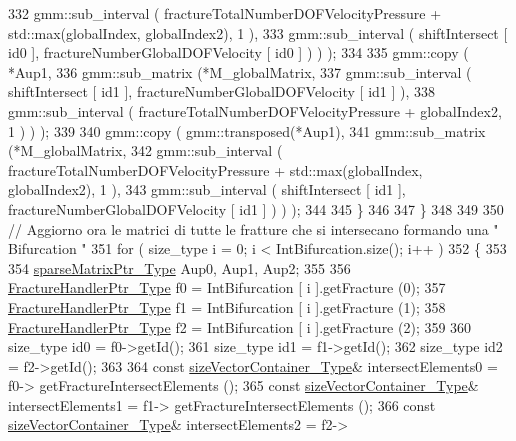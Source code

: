 \begin{DoxyCode}
332                                         gmm::sub\_interval (  fractureTotalNumberDOFVelocityPressure + 
      std::max(globalIndex, globalIndex2), 1 ),
333                                         gmm::sub\_interval ( shiftIntersect [ id0 ], 
      fractureNumberGlobalDOFVelocity [ id0 ] ) ) );
334 
335             gmm::copy ( *Aup1, 
336                         gmm::sub\_matrix (*M\_globalMatrix,
337                                         gmm::sub\_interval ( shiftIntersect [ id1 ], 
      fractureNumberGlobalDOFVelocity [ id1 ] ),
338                                         gmm::sub\_interval (  fractureTotalNumberDOFVelocityPressure + 
      globalIndex2, 1 ) ) );
339 
340             gmm::copy ( gmm::transposed(*Aup1), 
341                         gmm::sub\_matrix (*M\_globalMatrix,
342                                         gmm::sub\_interval (  fractureTotalNumberDOFVelocityPressure + 
      std::max(globalIndex, globalIndex2), 1 ),
343                                         gmm::sub\_interval ( shiftIntersect [ id1 ], 
      fractureNumberGlobalDOFVelocity [ id1 ] ) ) );
344 
345          \}
346         
347     \}
348     
349     
350     \textcolor{comment}{// Aggiorno ora le matrici di tutte le fratture che si intersecano formando una " Bifurcation "}
351     \textcolor{keywordflow}{for} ( size\_type i = 0; i < IntBifurcation.size(); i++ )
352     \{
353         
354         \hyperlink{Core_8h_a87137a9501b38c724ac80bc955164bb7}{sparseMatrixPtr\_Type} Aup0, Aup1, Aup2;
355             
356         \hyperlink{FractureHandler_8h_af23fb7a30aaff864bd42587af4f1e78a}{FractureHandlerPtr\_Type} f0 = IntBifurcation [ i ].getFracture (0);
357         \hyperlink{FractureHandler_8h_af23fb7a30aaff864bd42587af4f1e78a}{FractureHandlerPtr\_Type} f1 = IntBifurcation [ i ].getFracture (1);
358         \hyperlink{FractureHandler_8h_af23fb7a30aaff864bd42587af4f1e78a}{FractureHandlerPtr\_Type} f2 = IntBifurcation [ i ].getFracture (2);
359         
360         size\_type id0 = f0->getId();
361         size\_type id1 = f1->getId();
362         size\_type id2 = f2->getId();
363         
364         \textcolor{keyword}{const} \hyperlink{Core_8h_a80e8381d86ecb0a7f4f87ff84d1a0be5}{sizeVectorContainer\_Type}& intersectElements0 =  f0->
      getFractureIntersectElements ();
365         \textcolor{keyword}{const} \hyperlink{Core_8h_a80e8381d86ecb0a7f4f87ff84d1a0be5}{sizeVectorContainer\_Type}& intersectElements1 =  f1->
      getFractureIntersectElements ();
366         \textcolor{keyword}{const} \hyperlink{Core_8h_a80e8381d86ecb0a7f4f87ff84d1a0be5}{sizeVectorContainer\_Type}& intersectElements2 =  f2->

\end{DoxyCode}
